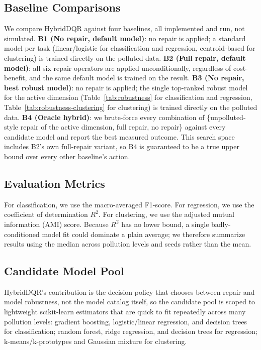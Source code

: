 \documentclass[runningheads]{llncs}
\begin{document}
\subsection{Baseline Comparisons}

We compare HybridDQR against four baselines, all implemented and
run, not simulated. \textbf{B1 (No repair, default model)}: no
repair is applied; a standard model per task (linear/logistic for
classification and regression, centroid-based for clustering) is
trained directly on the polluted data. \textbf{B2 (Full repair,
default model)}: all six repair operators are applied
unconditionally, regardless of cost-benefit, and the same default
model is trained on the result. \textbf{B3 (No repair, best robust
model)}: no repair is applied; the single top-ranked robust model
for the active dimension (Table~\ref{tab:robustness} for
classification and regression, Table~\ref{tab:robustness-clustering}
for clustering) is trained
directly on the polluted data. \textbf{B4 (Oracle hybrid)}: we
brute-force every combination of \{unpolluted-style repair of the
active dimension, full repair, no repair\} against every candidate
model and report the best measured outcome. This search space
includes B2's own full-repair variant, so B4 is guaranteed to be a
true upper bound over every other baseline's action.

\subsection{Evaluation Metrics}

For classification, we use the macro-averaged F1-score.
For regression, we use the coefficient of determination $R^2$.
For clustering, we use the adjusted mutual information (AMI) score.
Because $R^2$ has no lower bound, a single badly-conditioned model
fit could dominate a plain average; we therefore summarize results
using the median across pollution levels and seeds rather than the
mean.

\subsection{Candidate Model Pool}

HybridDQR's contribution is the decision policy that chooses
between repair and model robustness, not the model catalog itself,
so the candidate pool is scoped to lightweight scikit-learn
estimators that are quick to fit repeatedly across many pollution
levels: gradient boosting, logistic/linear regression, and decision
trees for classification; random forest, ridge regression, and
decision trees for regression; k-means/k-prototypes and Gaussian
mixture for clustering.
\end{document}

